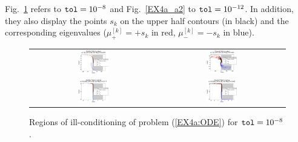\documentclass[a4paper,10pt]{report}%
\begin{document}
Fig.~\ref{EX4a_a1} refers to ${\tt tol}=10^{-8}$ and Fig.~\ref{EX4a_a2} to ${\tt tol}=10^{-12}$.
In addition, they also display the points $s_k$ on the upper half contours (in black) and the corresponding
eigenvalues ($\mu^{[k]}_+=+s_k$ in red, $\mu^{[k]}_-=-s_k$ in blue).
\begin{figure}[htb]
\centering
\begin{tabular}{cc}
\includegraphics[width=0.25\textwidth]{./FIGS/EX4a/EX4a_illcond_tol2_t1_Talbot1.eps} &
\includegraphics[width=0.25\textwidth]{./FIGS/EX4a/EX4a_illcond_tol2_t1_Talbot2.eps} \\
\includegraphics[width=0.25\textwidth]{./FIGS/EX4a/EX4a_illcond_tol2_t100_Talbot1.eps} &
\includegraphics[width=0.25\textwidth]{./FIGS/EX4a/EX4a_illcond_tol2_t100_Talbot2.eps}
\end{tabular}
\caption{\small Regions of ill-conditioning of problem (\ref{EX4a:ODE}) for ${\tt tol}=10^{-8}$.}
\label{EX4a_a1}
\end{figure}
\end{document}
